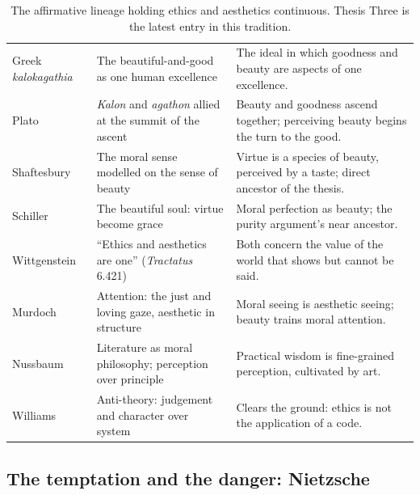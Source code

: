 \begin{table}[ht]
\centering
\small
\begin{tabularx}{\linewidth}{L{2.7cm} L{3.2cm} Z}
 &  &  \\
\midrule
Greek \emph{kalokagathia} & The beautiful-and-good as one human excellence & The ideal in which goodness and beauty are aspects of one excellence. \\
Plato & \emph{Kalon} and \emph{agathon} allied at the summit of the ascent & Beauty and goodness ascend together; perceiving beauty begins the turn to the good. \\
Shaftesbury \parencite{shaftesbury2001} & The moral sense modelled on the sense of beauty & Virtue is a species of beauty, perceived by a taste; direct ancestor of the thesis. \\
Schiller \parencite{schiller1967} & The beautiful soul: virtue become grace & Moral perfection as beauty; the purity argument's near ancestor. \\
Wittgenstein \parencite{wittgenstein1974} & ``Ethics and aesthetics are one'' (\emph{Tractatus} 6.421) & Both concern the value of the world that shows but cannot be said. \\
Murdoch \parencite{murdoch1970} & Attention: the just and loving gaze, aesthetic in structure & Moral seeing is aesthetic seeing; beauty trains moral attention. \\
Nussbaum \parencite{nussbaum1990} & Literature as moral philosophy; perception over principle & Practical wisdom is fine-grained perception, cultivated by art. \\
Williams \parencite{williams1985} & Anti-theory: judgement and character over system & Clears the ground: ethics is not the application of a code. \\
\end{tabularx}
\caption{The affirmative lineage holding ethics and aesthetics continuous. Thesis Three is the latest entry in this tradition.}
\label{p21:tab:continuity}
\end{table}

\subsection{The temptation and the danger: Nietzsche}
\label{p21:sub:cont-nietzsche}

